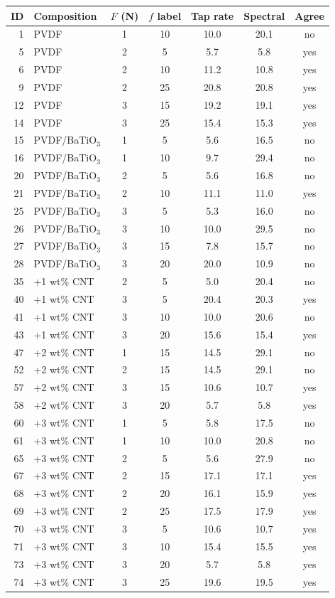 \footnotesize\setlength{\tabcolsep}{3pt}%
\begin{tabular}{@{}rlccccc@{}}
\toprule
ID & Composition & $F$ (N) & $f$ label & Tap rate & Spectral & Agree \\
\midrule
1 & PVDF & 1 & 10 & 10.0 & 20.1 & no \\
5 & PVDF & 2 & 5 & 5.7 & 5.8 & yes \\
6 & PVDF & 2 & 10 & 11.2 & 10.8 & yes \\
9 & PVDF & 2 & 25 & 20.8 & 20.8 & yes \\
12 & PVDF & 3 & 15 & 19.2 & 19.1 & yes \\
14 & PVDF & 3 & 25 & 15.4 & 15.3 & yes \\
15 & PVDF/BaTiO$_3$ & 1 & 5 & 5.6 & 16.5 & no \\
16 & PVDF/BaTiO$_3$ & 1 & 10 & 9.7 & 29.4 & no \\
20 & PVDF/BaTiO$_3$ & 2 & 5 & 5.6 & 16.8 & no \\
21 & PVDF/BaTiO$_3$ & 2 & 10 & 11.1 & 11.0 & yes \\
25 & PVDF/BaTiO$_3$ & 3 & 5 & 5.3 & 16.0 & no \\
26 & PVDF/BaTiO$_3$ & 3 & 10 & 10.0 & 29.5 & no \\
27 & PVDF/BaTiO$_3$ & 3 & 15 & 7.8 & 15.7 & no \\
28 & PVDF/BaTiO$_3$ & 3 & 20 & 20.0 & 10.9 & no \\
35 & +1 wt\% CNT & 2 & 5 & 5.0 & 20.4 & no \\
40 & +1 wt\% CNT & 3 & 5 & 20.4 & 20.3 & yes \\
41 & +1 wt\% CNT & 3 & 10 & 10.0 & 20.6 & no \\
43 & +1 wt\% CNT & 3 & 20 & 15.6 & 15.4 & yes \\
47 & +2 wt\% CNT & 1 & 15 & 14.5 & 29.1 & no \\
52 & +2 wt\% CNT & 2 & 15 & 14.5 & 29.1 & no \\
57 & +2 wt\% CNT & 3 & 15 & 10.6 & 10.7 & yes \\
58 & +2 wt\% CNT & 3 & 20 & 5.7 & 5.8 & yes \\
60 & +3 wt\% CNT & 1 & 5 & 5.8 & 17.5 & no \\
61 & +3 wt\% CNT & 1 & 10 & 10.0 & 20.8 & no \\
65 & +3 wt\% CNT & 2 & 5 & 5.6 & 27.9 & no \\
67 & +3 wt\% CNT & 2 & 15 & 17.1 & 17.1 & yes \\
68 & +3 wt\% CNT & 2 & 20 & 16.1 & 15.9 & yes \\
69 & +3 wt\% CNT & 2 & 25 & 17.5 & 17.9 & yes \\
70 & +3 wt\% CNT & 3 & 5 & 10.6 & 10.7 & yes \\
71 & +3 wt\% CNT & 3 & 10 & 15.4 & 15.5 & yes \\
73 & +3 wt\% CNT & 3 & 20 & 5.7 & 5.8 & yes \\
74 & +3 wt\% CNT & 3 & 25 & 19.6 & 19.5 & yes \\
\bottomrule
\end{tabular}
